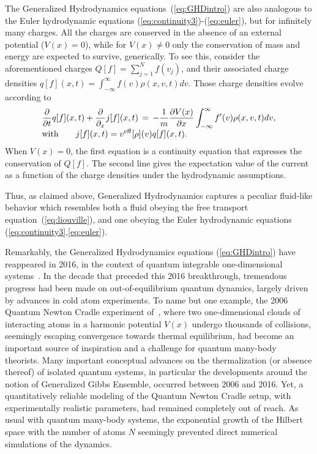 \documentclass[onecolumn,amsfonts,showpacs,superscriptaddress]{revtex4-1}
\begin{document}
The Generalized Hydrodynamics equations~(\ref{eq:GHDintro}) are also analogous to the Euler hydrodynamic equations (\ref{eq:continuity3})-(\ref{eq:euler}), but for infinitely many charges. All the charges are conserved in the absence of an external potential ($V(x) = 0$), while for $V(x) \neq 0$  only the conservation of mass and energy are expected to survive, generically. To see this, consider the aforementioned charges $Q[f] = \sum_{j=1}^N f(v_j)$, and their associated charge densities $q[f](x,t) = \int_{-\infty}^\infty f(v) \rho(x,v,t) dv$. Those charge densities evolve according to
\begin{equation}
    \label{eq:introGHD_continuity}
    \begin{array}{l}
   \displaystyle     \frac{\partial}{\partial t} q[f](x,t) + \frac{\partial}{\partial_x} j[f](x,t) \, = \, -\frac{1}{m} \frac{\partial V(x)}{\partial x} \int_{-\infty}^\infty  f'(v) \rho(x,v,t)  dv, \\
   \displaystyle {\rm with}  \qquad j[f](x,t) = v^{\rm eff}[\rho](v) q[f](x,t) .
    \end{array}
\end{equation}
When $V(x) = 0$, the first equation is a continuity equation that expresses the conservation of $Q[f]$. The second line gives the expectation value of the current as a function of the charge densities under the hydrodynamic assumptions.


Thus, as claimed above, Generalized Hydrodynamics captures a peculiar fluid-like behavior which resembles both a fluid obeying the free transport equation~(\ref{eq:liouville}), and one obeying the Euler hydrodynamic equations~ (\ref{eq:continuity3},\ref{eq:euler}).

\vspace{0.5cm}


Remarkably, the Generalized Hydrodynamics equations (\ref{eq:GHDintro}) have reappeared in 2016, in the context of quantum integrable one-dimensional systems~\citep{castro2016emergent,bertini2016transport}. In the decade that preceded this 2016 breakthrough, tremendous progress had been made on out-of-equilibrium quantum dynamics, largely driven by advances in cold atom experiments. To name but one example, the 2006 Quantum Newton Cradle experiment of~\cite{kinoshita2006quantum}, where two one-dimensional  clouds of interacting atoms in a harmonic potential $V(x)$ undergo thousands of collisions, seemingly escaping convergence towards thermal equilibrium, had become an important source of inspiration and a challenge for quantum many-body theorists. Many important conceptual advances on the thermalization (or absence thereof) of isolated quantum systems, in particular the developments around the notion of Generalized Gibbs Ensemble, occurred between 2006 and 2016. Yet, a quantitatively reliable modeling of the Quantum Newton Cradle setup, with experimentally realistic parameters, had remained completely out of reach. As usual with quantum many-body systems, the exponential growth of the Hilbert space with the number of atoms $N$ seemingly prevented direct numerical simulations of the dynamics.
\end{document}
